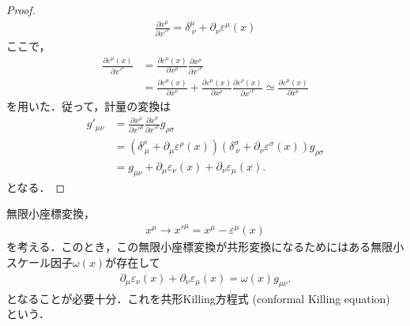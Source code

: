 \begin{proof}
	\begin{align}
		\frac{\partial{}x^{\mu}}{\partial{}x'^{\nu}}=\delta^{\mu}_{\ \nu}+\partial_{\nu}\varepsilon^{\mu}(x)
	\end{align}
	ここで，
	\begin{align}
		\frac{\partial\varepsilon^{\mu}(x)}{\partial{}x'^{\nu}} & =\frac{\partial\varepsilon^{\mu}(x)}{\partial{}x^{\rho}}\frac{\partial{}x^{\rho}}{\partial{}x'^{\nu}}                                                                                                                                   \\
		                                                        & =\frac{\partial\varepsilon^{\mu}(x)}{\partial{}x^{\nu}}+\frac{\partial\varepsilon^{\mu}(x)}{\partial{}x^{\rho}}\frac{\partial{}\varepsilon^{\rho}(x)}{\partial{}x'^{\nu}}\simeq{}\frac{\partial\varepsilon^{\mu}(x)}{\partial{}x^{\nu}}
	\end{align}
	を用いた．従って，計量の変換は
	\begin{align}
		g'_{\mu\nu} & =\frac{\partial{}x^{\rho}}{\partial{}x'^{\mu}}\frac{\partial{}x^{\sigma}}{\partial{}x'^{\nu}}g_{\rho\sigma}                               \\
		            & =(\delta^{\rho}_{\ \mu}+\partial_{\mu}\varepsilon^{\rho}(x))(\delta^{\sigma}_{\ \nu}+\partial_{\nu}\varepsilon^{\sigma}(x))g_{\rho\sigma} \\
		            & =g_{\mu\nu}+\partial_{\mu}\varepsilon_{\nu}(x)+\partial_{\nu}\varepsilon_{\mu}(x).
	\end{align}
	となる．
\end{proof}
\begin{prop}[共形Killing方程式]
	無限小座標変換，
	\begin{align}
		x^{\mu}\longrightarrow{}x'^{\mu}=x^{\mu}-\varepsilon^{\mu}(x)
	\end{align}
	を考える．このとき，この無限小座標変換が共形変換になるためにはある無限小スケール因子\(\omega(x)\)が存在して
	\begin{align}\label{eq::conformal-Killing-equation}
		\partial_{\mu}\varepsilon_{\nu}(x)+\partial_{\nu}\varepsilon_{\mu}(x)=\omega(x)g_{\mu\nu}.
	\end{align}
	となることが必要十分．これを共形Killing方程式 (conformal Killing equation) という．
\end{prop}
